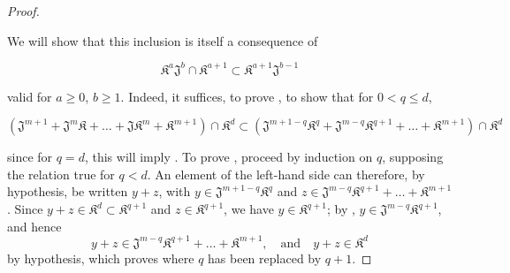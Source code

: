 \begin{proof}
\begin{env}[19.7.1.15]
We will show that this inclusion is itself a consequence of
\end{env}
\begin{env}[19.7.1.16]
\label{IV.19.7.1.16}
\[
  \mathfrak{K}^a\mathfrak{J}^b\cap\mathfrak{K}^{a+1}\subset\mathfrak{K}^{a+1}\mathfrak{J}^{b-1}
\]
\end{env}
valid for $a\geqslant 0$, $b\geqslant 1$. Indeed, it suffices, to prove , to show that for $0<q\leqslant d$,
\begin{env}[19.7.1.17]
\label{IV.19.7.1.17}
\[
  (\mathfrak{J}^{m+1}+\mathfrak{J}^m\mathfrak{K}+\ldots+\mathfrak{J}\mathfrak{K}^m+\mathfrak{K}^{m+1})\cap\mathfrak{K}^d\subset(\mathfrak{J}^{m+1-q}\mathfrak{K}^q+\mathfrak{J}^{m-q}\mathfrak{K}^{q+1}+\ldots+\mathfrak{K}^{m+1})\cap\mathfrak{K}^d
\]
\end{env}
since for $q=d$, this will imply . To prove , proceed by induction on $q$, supposing the relation true for $q<d$. An element of the left-hand side can therefore, by hypothesis, be written $y+z$, with $y\in\mathfrak{J}^{m+1-q}\mathfrak{K}^q$ and $z\in\mathfrak{J}^{m-q}\mathfrak{K}^{q+1}+\ldots+\mathfrak{K}^{m+1}$. Since $y+z\in\mathfrak{K}^d\subset\mathfrak{K}^{q+1}$ and $z\in\mathfrak{K}^{q+1}$, we have $y\in\mathfrak{K}^{q+1}$; by , $y\in\mathfrak{J}^{m-q}\mathfrak{K}^{q+1}$, and hence
\[
  y+z\in\mathfrak{J}^{m-q}\mathfrak{K}^{q+1}+\ldots+\mathfrak{K}^{m+1},\quad\text{and}\quad y+z\in\mathfrak{K}^d
\]
by hypothesis, which proves  where $q$ has been replaced by $q+1$.


\end{proof}
